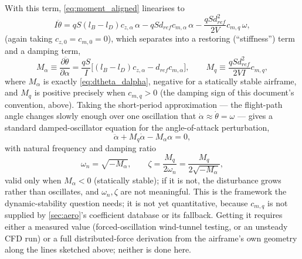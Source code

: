 With this term, \autoref{eq:moment_aligned} linearises to
\begin{equation}
    I\ddot\theta = qS(l_B-l_D)c_{z,\alpha}\,\alpha - qSd_{ref}c_{m,\alpha}\,\alpha
        - \frac{qSd_{ref}^2}{2V}c_{m,q}\,\omega,
\end{equation}
(again taking $c_{z,0}=c_{m,0}=0$), which separates into a restoring (``stiffness'') term and a
damping term,
\begin{equation}
    M_\alpha \equiv \frac{\partial\ddot\theta}{\partial\alpha}
        = \frac{qS}{I}\bigl[(l_B-l_D)c_{z,\alpha}-d_{ref}c_{m,\alpha}\bigr], \qquad
    M_q \equiv \frac{qSd_{ref}^2}{2VI}c_{m,q},
\end{equation}
where $M_\alpha$ is exactly \autoref{eq:dtheta_dalpha}, negative for a statically stable airframe,
and $M_q$ is positive precisely when $c_{m,q}>0$ (the damping sign of this document's convention,
above).
Taking the short-period approximation --- the flight-path angle changes slowly enough over one
oscillation that $\dot\alpha\approx\dot\theta=\omega$ --- gives a standard damped-oscillator
equation for the angle-of-attack perturbation,
\begin{equation}
    \ddot\alpha + M_q\dot\alpha - M_\alpha\alpha = 0,
\end{equation}
with natural frequency and damping ratio
\begin{equation}
    \omega_n = \sqrt{-M_\alpha}, \qquad \zeta = \frac{M_q}{2\omega_n} = \frac{M_q}{2\sqrt{-M_\alpha}},
\end{equation}
valid only when $M_\alpha<0$ (statically stable); if it is not, the disturbance grows rather than
oscillates, and $\omega_n,\zeta$ are not meaningful. This is the framework the dynamic-stability
question needs; it is not yet quantitative, because $c_{m,q}$ is not supplied by
\autoref{sec:aero}'s coefficient database or its fallback. Getting it requires either a measured
value (forced-oscillation wind-tunnel testing, or an unsteady CFD run) or a full distributed-force
derivation from the airframe's own geometry along the lines sketched above; neither is done here.
